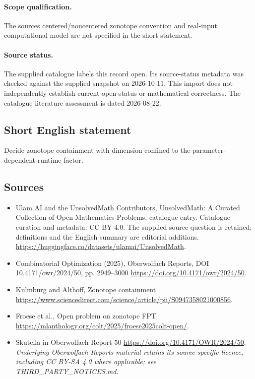 \documentclass[11pt]{article}
\begin{document}
\paragraph{Scope qualification.}
The source\textquotesingle s centered/noncentered zonotope convention and real-input computational model are not specified in the short statement.
\paragraph{Source status.}
The supplied catalogue labels this record open. Its source-status metadata was checked against the supplied snapshot on 2026-10-11. This import does not independently establish current open status or mathematical correctness. The catalogue literature assessment is dated 2026-08-22.
\subsection{Short English statement}
Decide zonotope containment with dimension confined to the parameter-dependent runtime factor.
\subsection{Sources}
\begin{itemize}
\item[S1] Ulam AI and the UnsolvedMath Contributors, UnsolvedMath: A Curated Collection of Open Mathematics Problems, catalogue entry. Catalogue curation and metadata: CC BY 4.0. The supplied source question is retained; definitions and the English summary are editorial additions.
\url{https://huggingface.co/datasets/ulamai/UnsolvedMath}.
\item[S2] Combinatorial Optimization (2025), Oberwolfach Reports, DOI 10.4171/owr/2024/50, pp. 2949--3000
\url{https://doi.org/10.4171/owr/2024/50}.
\item[S3] Kulmburg and Althoff, Zonotope containment
\url{https://www.sciencedirect.com/science/article/pii/S0947358021000856}.
\item[S4] Froese et al., Open problem on zonotope FPT
\url{https://mlanthology.org/colt/2025/froese2025colt-open/}.
\item[S5] Skutella in Oberwolfach Report 50
\url{https://doi.org/10.4171/OWR/2024/50}.
\textit{Underlying Oberwolfach Reports material retains its source-specific licence, including CC BY-SA 4.0 where applicable; see THIRD\_PARTY\_NOTICES.md.}
\end{itemize}
\end{document}
